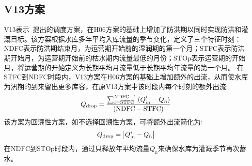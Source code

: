 \subsection{V13方案}
V13表示~\citet{voisin2013improved}提出的调度方案，在H06方案的基础上增加了防洪期以同时实现防洪和灌溉目标。该方案根据水库多年平均入库流量的季节变化，定义了三个特征时刻：NDFC表示防洪期结束月，为运营期开始前的湿润期的第一个月；STFC表示防洪期开始月，为运营期开始前的枯水期内流量最低的月份；STOp表示运营期的开始月，\citet{hanasaki2006reservoir}将运营期的开始定义为长期平均月流量低于长期平均年流量的第一个月。
在STFC到NDFC时段内，V13方案在H06方案的基础上增加额外的出流，从而使水库为汛期的到来留出更多库容，在原V13方案中该时段内每个时刻的额外出流:
\begin{equation}
  Q_{\rm drop} = \frac{\sum_{i = \text{STFC}}^{\text{NDFC} - 1}{{(Q}_{\text{in}}^{i} - Q_{\mathrm{n}})}}{\left( \text{NDFC} - \text{STFC} \right)}
\end{equation}
该方案为回溯性方案，如不选择回溯性方案，可将额外出流简化为:
\begin{equation}
  Q_{\rm drop} = \left| Q_{\text{in}}^{i} - Q_{\mathrm{n}} \right|
\end{equation}
在NDFC到STOp时段内，通过只释放年平均流量$Q_{\mathrm{n}}$来确保水库为灌溉季节再次蓄水。

